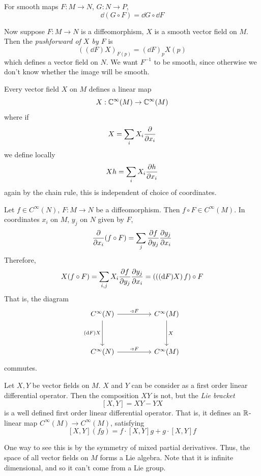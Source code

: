 \documentclass{article}
\begin{document}
\begin{remark}
    For smooth maps \(F : M \to N\), \(G : N \to P\),
    \[\dd(G \circ F) = \dd G \circ \dd F\]
\end{remark}

Now suppose \(F : M \to N\) is a diffeomorphism, \(X\) is a smooth vector field on \(M\). Then the \emph{pushforward of \(X\) by \(F\)} is
\[\left((\dd F)X\right)_{F(p)} = (\dd F)_pX(p)\]
which defines a vector field on \(N\). We want \(F^{-1}\) to be smooth, since otherwise we don't know whether the image will be smooth.

Every vector field \(X\) on \(M\) defines a linear map
\[X : \mathbb{C}^\infty(M) \to \mathbb{C}^\infty(M)\]
where if
\[X = \sum_i X_i \pdv{x_i}\]
we define locally
\[Xh = \sum_i X_i \pdv{h}{x_i}\]
again by the chain rule, this is independent of choice of coordinates.

Let \(f \in C^\infty(N)\), \(F : M \to N\) be a diffeomorphism. Then \(f \circ F \in C^\infty(M)\). In coordinates \(x_i\) on \(M\), \(y_j\) on \(N\) given by \(F\),
\[\pdv{x_i}(f \circ F) = \sum_j \pdv{f}{y_j}\pdv{y_j}{x_i}\]
Therefore,
\[X(f \circ F) = \sum_{i, j}X_i\pdv{f}{y_j}\pdv{y_j}{x_i} = \left(\left((\dd F)X\right)f\right) \circ F\]
That is, the diagram
\[\begin{tikzcd}
	{C^\infty(N)} && {C^\infty(M)} \\
	\\
	{C^\infty(N)} && {C^\infty(M)}
	\arrow["{\cdot \circ F}", from=1-1, to=1-3]
	\arrow["{\cdot \circ F}", from=3-1, to=3-3]
	\arrow["{(\dd F)X}"', from=1-1, to=3-1]
	\arrow["X", from=1-3, to=3-3]
\end{tikzcd}\]
commutes.

Let \(X, Y\) be vector fields on \(M\). \(X\) and \(Y\) can be consider as a first order linear differential operator. Then the composition \(XY\) is not, but the \emph{Lie bracket}
\[[X, Y] = XY - YX\]
is a well defined first order linear differential operator. That is, it defines an \(\mathbb{R}\)-linear map \(C^\infty(M) \to C^\infty(M)\), satisfying
\[[X, Y](fg) = f \cdot [X,Y]g + g \cdot [X, Y]f\]

One way to see this is by the symmetry of mixed partial derivatives. Thus, the space of all vector fields on \(M\) forms a Lie algebra. Note that it is infinite dimensional, and so it can't come from a Lie group.
\end{document}
